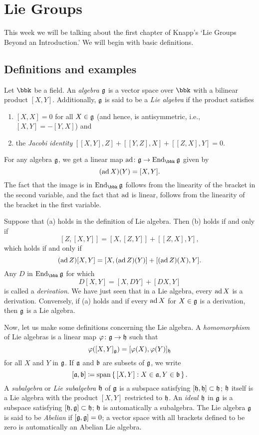 \section{Lie Groups}
This week we will be talking about the first chapter of Knapp's `Lie
Groups Beyond an Introduction.' We will begin with basic definitions.

\subsection{Definitions and examples}
Let $\bbk$ be a field. An \emph{algebra $\mathfrak{g}$} is a vector space over
$\bbk$ with a bilinear product $[X,Y]$. Additionally, $\mathfrak{g}$ is said to
be a \emph{Lie algebra} if the product satisfies
\begin{enumerate}[label=(\alph*),noitemsep]
\item $[X,X]=0$ for all $X\in\mathfrak{g}$ (and hence, is antisymmetric, i.e.,
  $[X,Y]=-[Y,X]$) and
\item the \emph{Jacobi identity} $[[X,Y],Z]+[[Y,Z],X]+[[Z,X],Y]=0$.
\end{enumerate}

For any algebra $\mathfrak{g}$, we get a linear map
$\ad\colon\frakg\to\End_\bbk\frakg$ given by
\[
  (\operatorname{ad} X)(Y)=[X,Y].
\]
The fact that the image is in $\End_\bbk\frakg$ follows from the linearity
of the bracket in the second variable, and the fact that $\operatorname{ad}$ is linear,
follows from the linearity of the bracket in the first variable.

Suppose that (a) holds in the definition of Lie algebra. Then (b) holds if
and only if
\[
  [Z,[X,Y]]=[X,[Z,Y]]+[[Z,X],Y],
\]
which holds if and only if
\[
  (\operatorname{ad} Z)[X,Y]=[X,(\operatorname{ad} Z)(Y)]+[(\operatorname{ad} Z)(X),Y].
\]
Any $D$ in $\End_\bbk\frakg$ for which
\[
D[X,Y]=[X,DY]+[DX,Y]
\]
is called a \emph{derivation}. We have just seen that in a Lie algebra,
every $\operatorname{ad} X$ is a derivation. Conversely, if (a) holds and if every $\operatorname{ad}
X$ for $X\in\mathfrak{g}$ is a derivation, then $\mathfrak{g}$ is a Lie algebra.

Now, let us make some definitions concerning the Lie algebra. A
\emph{homomorphism} of Lie algebras is a linear map
$\varphi\colon\mathfrak{g}\to\mathfrak{h}$ such that
\[
  \varphi([X,Y]_{\mathfrak{g}})=[\varphi(X),\varphi(Y)]_{\mathfrak{h}}
\]
for all $X$ and $Y$ in $\mathfrak{g}$. If $\mathfrak{a}$ and $\mathfrak{b}$ are subsets of
$\mathfrak{g}$, we write
\[
  [\mathfrak{a},\mathfrak{b}]\coloneq\operatorname{span}\left\{\,[X,Y]:X\in\mathfrak{a},Y\in\mathfrak{b}\,\right\}.
\]
A \emph{subalgebra} or \emph{Lie subalgebra} $\mathfrak{h}$ of $\mathfrak{g}$ is a
subspace satisfying $[\mathfrak{h},\mathfrak{h}]\subset\mathfrak{h}$; $\mathfrak{h}$ itself is a
Lie algebra with the product $[X,Y]$ restricted to $\mathfrak{h}$. An \emph{ideal
$\mathfrak{h}$} in $\mathfrak{g}$ is a subspace satisfying
$[\mathfrak{h},\mathfrak{g}]\subset\mathfrak{h}$; $\mathfrak{h}$ is automatically a subalgebra. The
Lie algebra $\mathfrak{g}$ is said to be \emph{Abelian} if $[\mathfrak{g},\mathfrak{g}]=0$; a
vector space with all brackets defined to be zero is automatically an
Abelian Lie algebra.

